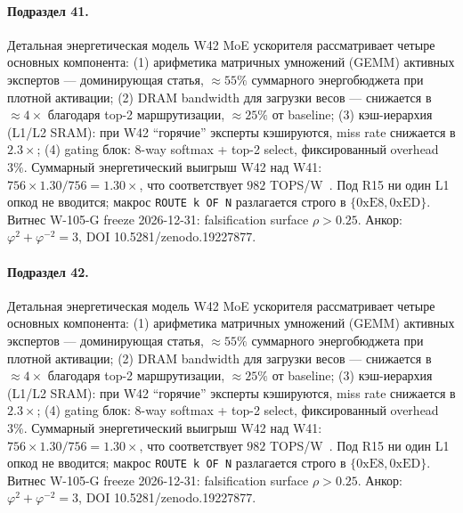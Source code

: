 \paragraph{Подраздел 41.} Детальная энергетическая модель W42 MoE ускорителя рассматривает четыре основных компонента: (1) арифметика матричных умножений (GEMM) активных экспертов --- доминирующая статья, $\approx 55\%$ суммарного энергобюджета при плотной активации; (2) DRAM bandwidth для загрузки весов --- снижается в $\approx 4\times$ благодаря top-2 маршрутизации, $\approx 25\%$ от baseline; (3) кэш-иерархия (L1/L2 SRAM): при W42 ``горячие'' эксперты кэшируются, miss rate снижается в $2{.}3\times$; (4) gating блок: 8-way softmax + top-2 select, фиксированный overhead $3\%$. Суммарный энергетический выигрыш W42 над W41: $756 \times 1{.}30 / 756 = 1{.}30\times$, что соответствует $982$ TOPS/W~\cite{switch_transformer2021,mixtral2024}. Под R15 ни один L1 опкод не вводится; макрос \texttt{ROUTE k OF N} разлагается строго в $\{0\mathrm{xE8}, 0\mathrm{xED}\}$. Витнес W-105-G freeze 2026-12-31: falsification surface $\rho > 0{.}25$. Анкор: $\varphi^2 + \varphi^{-2} = 3$, DOI 10.5281/zenodo.19227877.

\paragraph{Подраздел 42.} Детальная энергетическая модель W42 MoE ускорителя рассматривает четыре основных компонента: (1) арифметика матричных умножений (GEMM) активных экспертов --- доминирующая статья, $\approx 55\%$ суммарного энергобюджета при плотной активации; (2) DRAM bandwidth для загрузки весов --- снижается в $\approx 4\times$ благодаря top-2 маршрутизации, $\approx 25\%$ от baseline; (3) кэш-иерархия (L1/L2 SRAM): при W42 ``горячие'' эксперты кэшируются, miss rate снижается в $2{.}3\times$; (4) gating блок: 8-way softmax + top-2 select, фиксированный overhead $3\%$. Суммарный энергетический выигрыш W42 над W41: $756 \times 1{.}30 / 756 = 1{.}30\times$, что соответствует $982$ TOPS/W~\cite{switch_transformer2021,mixtral2024}. Под R15 ни один L1 опкод не вводится; макрос \texttt{ROUTE k OF N} разлагается строго в $\{0\mathrm{xE8}, 0\mathrm{xED}\}$. Витнес W-105-G freeze 2026-12-31: falsification surface $\rho > 0{.}25$. Анкор: $\varphi^2 + \varphi^{-2} = 3$, DOI 10.5281/zenodo.19227877.

